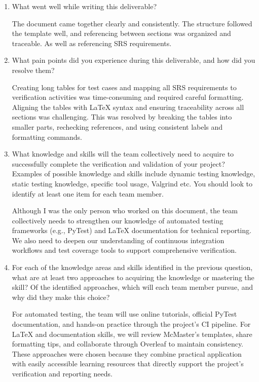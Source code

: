 \documentclass[12pt, titlepage]{article}
\begin{document}
\begin{enumerate}
  \item What went well while writing this deliverable?

  The document came together clearly and consistently. The structure followed the template well, and referencing between sections was organized and traceable.
  As well as referencing SRS requirements.

  \item What pain points did you experience during this deliverable, and how
    did you resolve them?

  Creating long tables for test cases and mapping all SRS requirements to verification activities was time-consuming and required careful formatting.
  Aligning the tables with LaTeX syntax and ensuring traceability across all sections was challenging.
  This was resolved by breaking the tables into smaller parts, rechecking references, and using consistent labels and formatting commands.

  \item What knowledge and skills will the team collectively need to acquire to
    successfully complete the verification and validation of your project?
    Examples of possible knowledge and skills include dynamic testing knowledge,
    static testing knowledge, specific tool usage, Valgrind etc.  You should look to
    identify at least one item for each team member.

  Although I was the only person who worked on this document,
  the team collectively needs to strengthen our knowledge of automated testing frameworks (e.g., PyTest) and LaTeX documentation for technical reporting.
  We also need to deepen our understanding of continuous integration workflows and test coverage tools to support comprehensive verification.

  \item For each of the knowledge areas and skills identified in the previous
    question, what are at least two approaches to acquiring the knowledge or
    mastering the skill?  Of the identified approaches, which will each team
    member pursue, and why did they make this choice?

  For automated testing, the team will use online tutorials, official PyTest documentation, and hands-on practice through the project’s CI pipeline.
  For LaTeX and documentation skills, we will review McMaster’s templates, share formatting tips, and collaborate through Overleaf to maintain consistency.
  These approaches were chosen because they combine practical application with easily accessible learning resources that directly support the project’s verification and reporting needs.
\end{enumerate}
\end{document}
